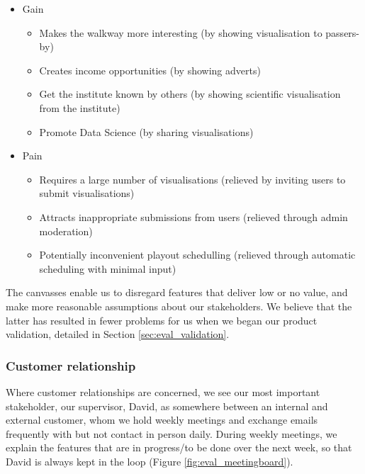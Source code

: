 \documentclass[a4paper, titlepage]{article}
\begin{document}
\begin{itemize}

\item Gain
   \begin{itemize}
      \itemsep-2mm
      \item Makes the walkway more interesting (by showing visualisation to passers-by)
      \item Creates income opportunities (by showing adverts)
      \item Get the institute known by others (by showing scientific visualisation from the institute)
      \item Promote Data Science (by sharing visualisations)
   \end{itemize}

\item Pain
   \begin{itemize}
      \itemsep-2mm
      \item Requires a large number of visualisations (relieved by inviting users to submit visualisations)
      \item Attracts inappropriate submissions from users (relieved through admin moderation)
      \item Potentially inconvenient playout schedulling (relieved through automatic scheduling with minimal input)
   \end{itemize}
\end{itemize} 


The canvasses enable us to disregard features that deliver low or no value, and make more reasonable assumptions about our stakeholders. We believe that the latter has resulted in fewer problems for us when we began our product validation, detailed in Section \ref{sec:eval_validation}.




\subsubsection{Customer relationship}

Where customer relationships are concerned, we see our most important stakeholder, our supervisor, David, as somewhere between an internal and external customer, whom we hold weekly meetings and exchange emails frequently with but not contact in person daily. During weekly meetings, we explain the features that are in progress/to be done over the next week, so that David is always kept in the loop (Figure \ref{fig:eval_meetingboard}).
\end{document}
